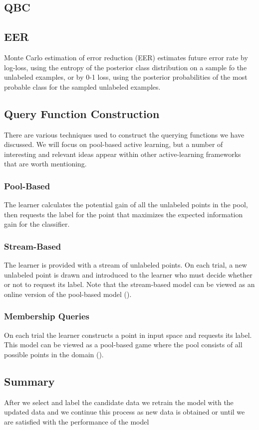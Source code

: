 \subsection{QBC}

\subsection{EER}
Monte Carlo estimation of error reduction (EER) estimates future error rate by log-loss, using the entropy of the posterior class distribution on a sample fo the unlabeled examples, or by 0-1 loss, using the posterior probabilities of the most probable class for the sampled unlabeled examples. 
\cite{roy2001toward}

\subsection{Query Function Construction}
There are various techniques used to construct the querying functions we have discussed. We will focus on pool-based active learning, but a number of interesting and relevant ideas
appear within other active-learning frameworks that are worth mentioning.

\subsubsection{Pool-Based}
The learner calculates the potential gain of all the unlabeled points in the pool, then requests the label for the point that maximizes the expected information gain for the classifier.

\subsubsection{Stream-Based}
The learner is provided with a stream of unlabeled points. On each trial, a new unlabeled point is drawn and introduced to the learner who must decide whether or not to request its label. Note that the stream-based model can be viewed as an online version of the pool-based model (\cite{baram2004online}). 

\subsubsection{Membership Queries}
On each trial the learner constructs a point in input space and requests its label. This model can be viewed as a pool-based game where the pool consists of all possible points in the domain (\cite{baram2004online}).

\subsection{Summary}
After we select and label the candidate data we retrain the model with the updated data and we continue this process as new data is obtained or until we are satisfied with the performance of the model


